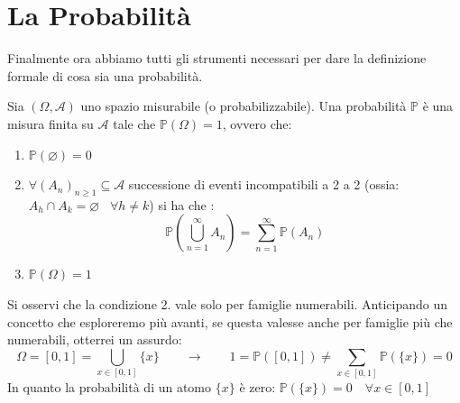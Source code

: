 \section{La Probabilità}
Finalmente ora abbiamo tutti gli strumenti necessari per dare la definizione formale di cosa sia una probabilità.
\begin{definizione}
    Sia $(\Omega, \mathcal{A})$ uno spazio misurabile (o probabilizzabile). Una probabilità $\mathbb{P}$ è una misura finita su $\mathcal{A}$ tale che $\mathbb{P}(\Omega)=1$, ovvero che:
    \begin{enumerate}
        \item $\mathbb{P}(\varnothing)=0$
        \item $\forall(A_n)_{n\geq1}\subseteq\mathcal{A}$ successione di eventi incompatibili a 2 a 2 (ossia: $A_h \cap A_k = \varnothing\;\;\;\forall h \neq k$) si ha che : \[\mathbb{P}\left(\bigcup_{n=1}^{\infty} A_n\right) = \sum_{n=1}^{\infty}\mathbb{P}(A_n)\]
        \item $\mathbb{P}(\Omega)=1$
    \end{enumerate}
\end{definizione}

Si osservi che la condizione 2. vale solo per famiglie numerabili. Anticipando un concetto che esploreremo più avanti, se questa valesse anche per famiglie più che numerabili, otterrei un assurdo:
\[\Omega = [0, 1] = \bigcup_{x\in[0, 1]}\{x\}\qquad \rightarrow\qquad 1 = \mathbb{P}([0, 1]) \neq \sum_{x\in [0, 1]} \mathbb{P}(\{x\}) = 0 \]
In quanto la probabilità di un atomo $\{x\}$ è zero: $\mathbb{P}(\{x\}) = 0 \quad \forall x \in [0, 1]$

